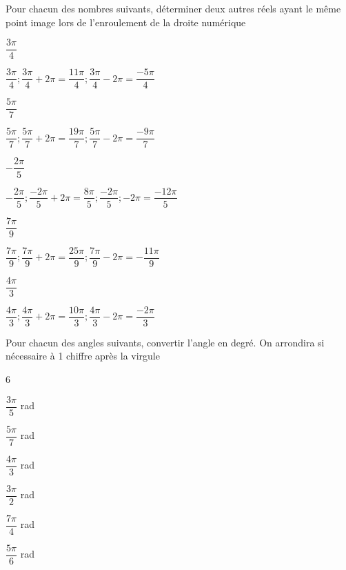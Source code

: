 \documentclass[11pt,a4paper]{article}  %
\begin{document}

Pour chacun des nombres suivants, déterminer deux autres réels ayant le même point image lors de l'enroulement de la droite numérique
	\begin{enumMet}
		\item $\dfrac{3\pi}{4}$
		\begin{corrBox}
			$\dfrac{3 \pi}{4} ; \dfrac{3 \pi}{4}+2 \pi=\dfrac{11 \pi}{4} ; \dfrac{3 \pi}{4}-2 \pi=\dfrac{-5 \pi}{4}$		
		\end{corrBox}
		\item $\dfrac{5\pi}{7}$
		\begin{corrBox}
			$\dfrac{5 \pi}{7} ; \dfrac{5 \pi}{7}+2 \pi=\dfrac{19 \pi}{7} ; \dfrac{5 \pi}{7}-2 \pi=\dfrac{-9 \pi}{7}$	
		\end{corrBox}
		\item $-\dfrac{2\pi}{5}$
		\begin{corrBox}
			$-\dfrac{2 \pi}{5} ; \dfrac{-2 \pi}{5}+2 \pi=\dfrac{8 \pi}{5} ; \dfrac{-2 \pi}{5} ;-2 \pi=\dfrac{-12 \pi}{5}$			
		\end{corrBox}
		\item $\dfrac{7\pi}{9}$
		\begin{corrBox}
			$\dfrac{7 \pi}{9} ; \dfrac{7 \pi}{9}+2 \pi=\dfrac{25 \pi}{9} ; \dfrac{7 \pi}{9}-2 \pi=-\dfrac{11 \pi}{9}$		
		\end{corrBox}
		\item $\dfrac{4\pi}{3}$
		\begin{corrBox}
			$\dfrac{4 \pi}{3} ; \dfrac{4 \pi}{3}+2 \pi=\dfrac{10 \pi}{3} ; \dfrac{4 \pi}{3}-2 \pi=\dfrac{-2 \pi}{3}$	
		\end{corrBox}
	\end{enumMet}


Pour chacun des angles suivants, convertir l'angle en degré. On arrondira si nécessaire à 1 chiffre après la virgule
\begin{multicols}{6}
	\begin{enumMet}
		\item $\dfrac{3\pi}{5}$ rad
		\item $\dfrac{5\pi}{7}$ rad
		\item $\dfrac{4\pi}{3}$ rad
		\item $\dfrac{3\pi}{2}$ rad
		\item $\dfrac{7\pi}{4}$ rad
		\item $\dfrac{5\pi}{6}$ rad
	\end{enumMet}
\end{multicols}
\end{document}

